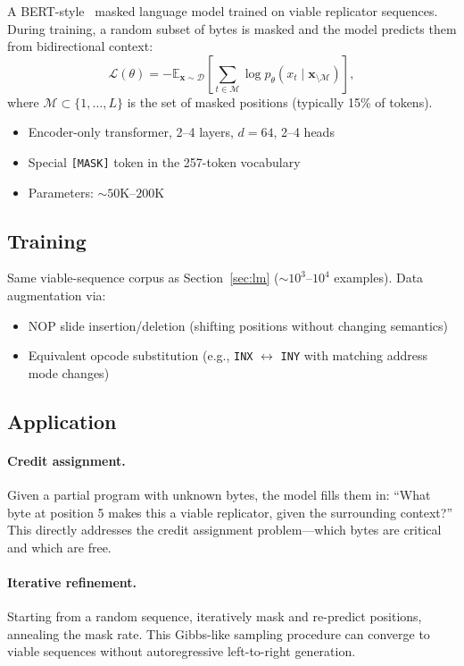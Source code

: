 \documentclass{article}
\newcommand{\opcode}[1]{\texttt{#1}}
\begin{document}
A BERT-style~\cite{devlin2019bert} masked language model trained on viable
replicator sequences.  During training, a random subset of bytes is masked
and the model predicts them from bidirectional context:
\begin{equation}
  \mathcal{L}(\theta) = -\mathbb{E}_{\mathbf{x} \sim \mathcal{D}}
    \left[\sum_{t \in \mathcal{M}} \log p_\theta(x_t \mid \mathbf{x}_{\setminus\mathcal{M}})\right],
\end{equation}
where $\mathcal{M} \subset \{1,\ldots,L\}$ is the set of masked positions
(typically 15\% of tokens).

\begin{itemize}
  \item Encoder-only transformer, 2--4 layers, $d=64$, 2--4 heads
  \item Special \texttt{[MASK]} token in the 257-token vocabulary
  \item Parameters: ${\sim}50$K--$200$K
\end{itemize}

\subsection{Training}

Same viable-sequence corpus as Section~\ref{sec:lm} (${\sim}10^3$--$10^4$
examples).  Data augmentation via:
\begin{itemize}
  \item NOP slide insertion/deletion (shifting positions without changing
        semantics)
  \item Equivalent opcode substitution (e.g., \opcode{INX} $\leftrightarrow$
        \opcode{INY} with matching address mode changes)
\end{itemize}

\subsection{Application}

\paragraph{Credit assignment.}
Given a partial program with unknown bytes, the model fills them in:
``What byte at position 5 makes this a viable replicator, given the
surrounding context?''  This directly addresses the credit assignment
problem---which bytes are critical and which are free.

\paragraph{Iterative refinement.}
Starting from a random sequence, iteratively mask and re-predict positions,
annealing the mask rate.  This Gibbs-like sampling procedure can converge
to viable sequences without autoregressive left-to-right generation.
\end{document}
